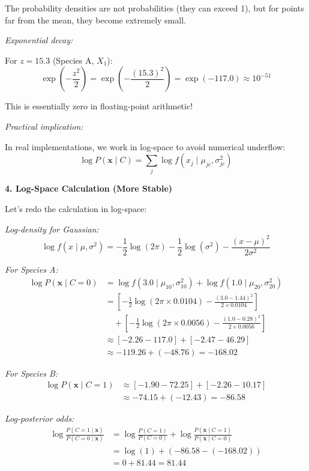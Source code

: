 \documentclass[12pt]{article}
\begin{document}
\begin{explanation}
The probability densities are not probabilities (they can exceed 1), but for points far from the mean, they become extremely small.

\textit{Exponential decay:}

For $z = 15.3$ (Species A, $X_1$):
\[
\exp\left(-\frac{z^2}{2}\right) = \exp\left(-\frac{(15.3)^2}{2}\right) = \exp(-117.0) \approx 10^{-51}
\]

This is essentially zero in floating-point arithmetic!

\textit{Practical implication:}

In real implementations, we work in log-space to avoid numerical underflow:
\[
\log P(\mathbf{x} \mid C) = \sum_j \log f(x_j \mid \mu_{jc}, \sigma_{jc}^2)
\]

\textbf{4. Log-Space Calculation (More Stable)}

Let's redo the calculation in log-space:

\textit{Log-density for Gaussian:}
\[
\log f(x \mid \mu, \sigma^2) = -\frac{1}{2}\log(2\pi) - \frac{1}{2}\log(\sigma^2) - \frac{(x-\mu)^2}{2\sigma^2}
\]

\textit{For Species A:}
\begin{align}
\log P(\mathbf{x} \mid C=0) &= \log f(3.0 \mid \mu_{10}, \sigma_{10}^2) + \log f(1.0 \mid \mu_{20}, \sigma_{20}^2) \\
&= \left[-\frac{1}{2}\log(2\pi \times 0.0104) - \frac{(3.0-1.44)^2}{2 \times 0.0104}\right] \\
&\quad + \left[-\frac{1}{2}\log(2\pi \times 0.0056) - \frac{(1.0-0.28)^2}{2 \times 0.0056}\right] \\
&\approx [-2.26 - 117.0] + [-2.47 - 46.29] \\
&\approx -119.26 + (-48.76) = -168.02
\end{align}

\textit{For Species B:}
\begin{align}
\log P(\mathbf{x} \mid C=1) &\approx [-1.90 - 72.25] + [-2.26 - 10.17] \\
&\approx -74.15 + (-12.43) = -86.58
\end{align}

\textit{Log-posterior odds:}
\begin{align}
\log \frac{P(C=1 \mid \mathbf{x})}{P(C=0 \mid \mathbf{x})} &= \log \frac{P(C=1)}{P(C=0)} + \log \frac{P(\mathbf{x} \mid C=1)}{P(\mathbf{x} \mid C=0)} \\
&= \log(1) + (-86.58 - (-168.02)) \\
&= 0 + 81.44 = 81.44
\end{align}


\end{explanation}
\end{document}
